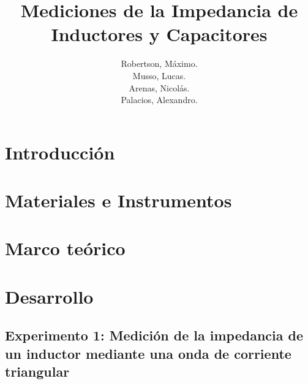 

\title{Mediciones de la Impedancia de Inductores y
Capacitores}
\author{
    Robertson, Máximo. \par 
    Musso, Lucas.  \par 
    Arenas, Nicolás. \par 
    Palacios, Alexandro. \par 
}
\legajo{
    89712 \par 
    91934 \par 
    86607 \par 
    91454 \par
}



\maketitle

\tableofcontents
\newpage


\section{Introducción}


\newpage
\section{Materiales e Instrumentos}


\newpage
\section{Marco teórico}


\newpage
\section{Desarrollo}

\subsection{Experimento 1: Medición de la impedancia de un inductor mediante una onda de
corriente triangular}


